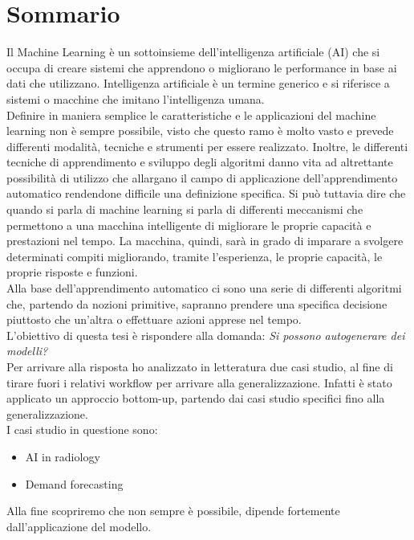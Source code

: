 \documentclass[12pt,a4paper]{report}
\begin{document}
\chapter*{Sommario}
Il Machine Learning è un sottoinsieme dell'intelligenza artificiale (AI) che si occupa di creare sistemi che apprendono o migliorano le performance in base ai dati che utilizzano. Intelligenza artificiale è un termine generico e si riferisce a sistemi o macchine che imitano l'intelligenza umana.\\
Definire in maniera semplice le caratteristiche e le applicazioni del machine learning non è sempre possibile, visto che questo ramo è molto vasto e prevede differenti modalità, tecniche e strumenti per essere realizzato. Inoltre, le differenti tecniche di apprendimento e sviluppo degli algoritmi danno vita ad altrettante possibilità di utilizzo che allargano il campo di applicazione dell’apprendimento automatico rendendone difficile una definizione specifica. Si può tuttavia dire che quando si parla di machine learning si parla di differenti meccanismi che permettono a una macchina intelligente di migliorare le proprie capacità e prestazioni nel tempo. La macchina, quindi, sarà in grado di imparare a svolgere determinati compiti migliorando, tramite l’esperienza, le proprie capacità, le proprie risposte e funzioni.\\
Alla base dell’apprendimento automatico ci sono una serie di differenti algoritmi che, partendo da nozioni primitive, sapranno prendere una specifica decisione piuttosto che un’altra o effettuare azioni apprese nel tempo.\\
L'obiettivo di questa tesi è rispondere alla domanda: \emph{Si possono autogenerare dei modelli?}\\
Per arrivare alla risposta ho analizzato in letteratura due casi studio, al fine di tirare fuori i relativi workflow per arrivare alla generalizzazione. Infatti è stato applicato un approccio bottom-up, partendo dai casi studio specifici fino alla generalizzazione.\\
I casi studio in questione sono:
\begin{itemize}
    \item AI in radiology
    \item Demand forecasting
\end{itemize}
Alla fine scopriremo che non sempre è possibile, dipende fortemente dall'applicazione del modello.

\tableofcontents
\end{document}
